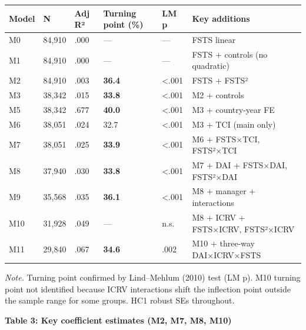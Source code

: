 \documentclass[12pt,a4paper]{article}
\begin{document}
\begin{longtable}[]{@{}llllll@{}}
\toprule\noalign{}
Model & N & Adj R² & Turning point (\%) & LM p & Key additions \\
\midrule\noalign{}
\endhead
\bottomrule\noalign{}
\endlastfoot
M0 & 84,910 & .000 & --- & --- & FSTS linear \\
M1 & 84,910 & .000 & --- & --- & FSTS + controls (no quadratic) \\
M2 & 84,910 & .003 & \textbf{36.4} & \textless.001 & FSTS + FSTS² \\
M3 & 38,342 & .015 & \textbf{33.8} & \textless.001 & M2 + controls \\
M5 & 38,342 & .677 & \textbf{40.0} & \textless.001 & M3 + country-year
FE \\
M6 & 38,051 & .024 & 32.7 & \textless.001 & M3 + TCI (main only) \\
M7 & 38,051 & .025 & \textbf{33.9} & \textless.001 & M6 + FSTS×TCI,
FSTS²×TCI \\
M8 & 37,940 & .030 & \textbf{33.8} & \textless.001 & M7 + DAI +
FSTS×DAI, FSTS²×DAI \\
M9 & 35,568 & .035 & \textbf{36.1} & \textless.001 & M8 + manager +
interactions \\
M10 & 31,928 & .049 & --- & n.s. & M8 + ICRV + FSTS×ICRV, FSTS²×ICRV \\
M11 & 29,840 & .067 & \textbf{34.6} & .002 & M10 + three-way
DAI×ICRV×FSTS \\
\end{longtable}

\emph{Note.} Turning point confirmed by Lind--Mehlum (2010) test (LM p).
M10 turning point not identified because ICRV interactions shift the
inflection point outside the sample range for some groups. HC1 robust
SEs throughout.

\textbf{Table 3: Key coefficient estimates (M2, M7, M8, M10)}
\end{document}
